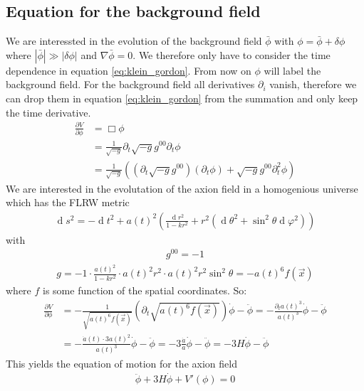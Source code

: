 \documentclass[a4paper]{article}
\DeclareMathOperator*{\diff}{d}
\begin{document}
\subsection{Equation for the background field}
We are interessted in the evolution of the background field $\bar{\phi}$ with $\phi = \bar{\phi} + \delta \phi$ where
$|\bar{\phi}| \gg |\delta \phi|$ and $\nabla \bar{\phi} = 0$. We therefore only have to consider the time dependence in equation \ref{eq:klein_gordon}. From now on $\phi$ will label the background field.
For the background field all derivatives $\partial_i$ vanish, therefore we can drop them in equation \ref{eq:klein_gordon} from the summation and only keep the time derivative.
\begin{align*}
    \frac{\partial V}{\partial \phi} &= \Box \phi \\
                                     &= \frac{1}{\sqrt{-g}} \partial_t \sqrt{-g} g^{00} \partial_t \phi \\
                                     &= \frac{1}{\sqrt{-g}} \left( (\partial_t \sqrt{-g} g^{00}) (\partial_t \phi) + \sqrt{-g} g^{00} \partial^2_t \phi \right)
\end{align*}
We are interested in the evolutation of the axion field in a homogenious universe which has the FLRW metric \cite[Chap. 1.3.2., Page 20]{CosmologyBookMukhanov}
\begin{align}
    \label{eq:flrw}
    \diff s^2 = -\diff t^2 + a(t)^2 \left(\frac{\diff r^2}{1 - kr^2} + r^2(\diff \theta^2 + \sin^2 \theta \diff  \varphi^2)\right)
\end{align}
with
\begin{align*}
    g^{00} = -1
\end{align*}
\begin{align*}
    g = -1 \cdot \frac{a(t)^2}{1 - kr^2} \cdot a(t)^2 r^2 \cdot a(t)^2 r^2 \sin^2 \theta
      = - a(t)^6 f(\vec{x})
\end{align*}
where $f$ is some function of the spatial coordinates.
So:
\begin{align*}
    \frac{\partial V}{\partial \phi} &= - \frac{1}{\sqrt{a(t)^6 f(\vec{x})}} (\partial_t \sqrt{ a(t)^6 f(\vec{x}) }) \dot{\phi} - \ddot{\phi}
                                     = - \frac{\partial_t a(t)^3}{a(t)^3} \dot{\phi} - \ddot{\phi} \\
                                     &= - \frac{\dot{a}(t) \cdot 3 a(t)^2}{a(t)^3} \dot{\phi} - \ddot{\phi}
                                     = - 3 \frac{\dot{a}}{a} \dot{\phi} - \ddot{\phi}
                                     = - 3H \dot{\phi} - \ddot{\phi}
\end{align*}
This yields the equation of motion for the axion field \cite[Chap 4.2, Page 25]{MarshAxionCosmo}
\begin{align}
    \label{eq:eom}
    \ddot{\phi} + 3 H \dot{\phi} + V'(\phi) = 0
\end{align}
\end{document}
